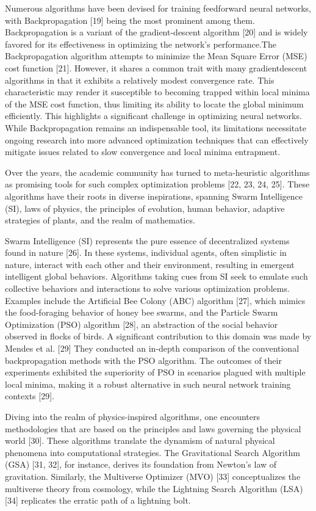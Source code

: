 Numerous algorithms have been devised for training feedforward neural networks, with Backpropagation [19] being the most prominent among them. Backpropagation is a variant of the gradient-descent algorithm [20] and is widely favored for its effectiveness in optimizing the network’s performance.The Backpropagation algorithm attempts to minimize the Mean Square Error (MSE) cost function [21]. However, it shares a common trait with many gradientdescent algorithms in that it exhibits a relatively modest convergence rate. This characteristic may render it susceptible to becoming trapped within local minima of the MSE cost function, thus limiting its ability to locate the global minimum efficiently. This highlights a significant challenge in optimizing neural networks. While Backpropagation remains an indispensable tool, its limitations necessitate ongoing research into more advanced optimization techniques that can effectively mitigate issues related to slow convergence and local minima entrapment.

Over the years, the academic community has turned to meta-heuristic algorithms as promising tools for such complex optimization problems [22, 23, 24, 25]. These algorithms have their roots in diverse inspirations, spanning Swarm Intelligence (SI), laws of physics, the principles of evolution, human behavior, adaptive strategies of plants, and the realm of mathematics.

Swarm Intelligence (SI) represents the pure essence of decentralized systems found in nature [26]. In these systems, individual agents, often simplistic in nature, interact with each other and their environment, resulting in emergent intelligent global behaviors. Algorithms taking cues from SI seek to emulate such collective behaviors and interactions to solve various optimization problems. Examples include the Artificial Bee Colony (ABC) algorithm [27], which mimics the food-foraging behavior of honey bee swarms, and the Particle Swarm Optimization (PSO) algorithm [28], an abstraction of the social behavior observed in flocks of birds. A significant contribution to this domain was made by Mendes et al. [29] They conducted an in-depth comparison of the conventional backpropagation methods with the PSO algorithm. The outcomes of their experiments exhibited the superiority of PSO in scenarios plagued with multiple local minima, making it a robust alternative in such neural network training contexts [29].

Diving into the realm of physics-inspired algorithms, one encounters methodologies that are based on the principles and laws governing the physical world [30]. These algorithms translate the dynamism of natural physical phenomena into computational strategies. The Gravitational Search Algorithm (GSA) [31, 32], for instance, derives its foundation from Newton’s law of gravitation. Similarly, the Multiverse Optimizer (MVO) [33] conceptualizes the multiverse theory from cosmology, while the Lightning Search Algorithm (LSA) [34] replicates the erratic path of a lightning bolt.

